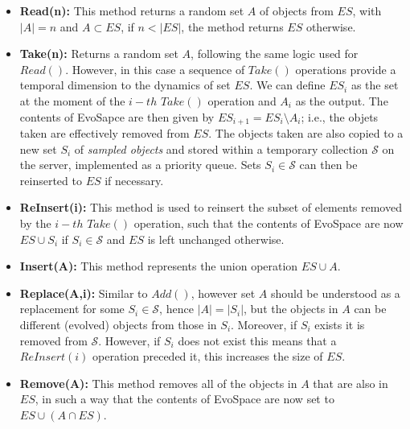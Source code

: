 \begin{itemize}
 \item \textbf{Read(n):} This method returns a random set $A$ of objects from $ES$, with $|A|=n$ and $A\subset ES$, if $n< |ES|$, the method returns $ES$ otherwise.

 \item \textbf{Take(n):} Returns a random set $A$, following the same logic used for $Read()$.
However, in this case a sequence of $Take()$ operations provide a temporal dimension to the dynamics of set $ES$.
We can define $ES_i$ as the set at the moment of the $i-th$ $Take()$ operation and $A_i$ as the output.
The contents of EvoSapce are then given by $ES_{i+1}= ES_i \setminus A_i$; i.e., the objets taken are effectively removed from $ES$.
The objects taken are also copied to a new set $S_i$ of \emph{sampled objects} and stored
within a temporary collection $\mathcal{S}$ on the server, implemented as a priority queue.
Sets $S_i \in \mathcal{S}$ can then be reinserted to $ES$ if necessary.

 \item \textbf{ReInsert(i):} This method is used to reinsert the subset of elements removed by the $i-th$ $Take()$ operation,
  such that the contents of EvoSpace are now $ES \cup S_i$ if $S_i \in \mathcal{S}$ and $ES$ is left unchanged otherwise.

 \item \textbf{Insert(A):} This method represents the union operation $ES \cup A$.

 \item \textbf{Replace(A,i):} Similar to $Add()$, however set $A$ should be understood as a replacement for
  some $S_i \in \mathcal{S}$, hence $|A| = |S_i|$, but the objects in $A$ can be different (evolved) objects from those in $S_i$.
  Moreover, if $S_i$ exists it is removed from $\mathcal{S}$.
  However, if $S_i$ does not exist this means that a $ReInsert(i)$ operation preceded it, this increases the size of $ES$.

 \item \textbf{Remove(A):} This method removes all of the objects in $A$ that are also in $ES$, in such a way that
  the contents of EvoSpace are now set to $ES \cup (A\cap ES)$.
\end{itemize}

